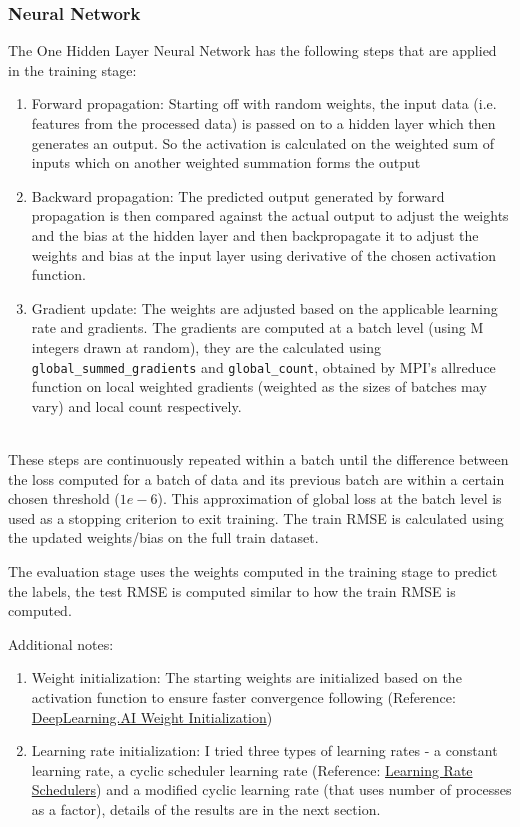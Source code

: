 \documentclass{article}
\begin{document}
\subsubsection{Neural Network}
The One Hidden Layer Neural Network has the following steps that are applied in the training stage:
\begin{enumerate}
    \item Forward propagation: Starting off with random weights, the input data (i.e. features from the processed data) is passed on to a hidden layer which then generates an output. So the activation is calculated on the weighted sum of inputs which on another weighted summation forms the output
    \item Backward propagation: The predicted output generated by forward propagation is then compared against the actual output to adjust the weights and the bias at the hidden layer and then backpropagate it to adjust the weights and bias at the input layer using derivative of the chosen activation function. 
    \item Gradient update: The weights are adjusted based on the applicable learning rate and gradients. The gradients are computed at a batch level (using M integers drawn at random), they are the calculated using \\ \verb|global_summed_gradients| and \verb|global_count|, obtained by MPI's allreduce function on local weighted gradients (weighted as the sizes of batches may vary) and local count respectively.
\end{enumerate} \\

These steps are continuously repeated within a batch until the difference between the loss computed for a batch of data and its previous batch are within a certain chosen threshold ($1e-6$). This approximation of global loss at the batch level is used as a stopping criterion to exit training. The train RMSE is calculated using the updated weights/bias on the full train dataset.

The evaluation stage uses the weights computed in the training stage to predict the labels, the test RMSE is computed similar to how the train RMSE is computed. 

Additional notes:

\begin{enumerate}
    \item Weight initialization: The starting weights are initialized based on the activation function to ensure faster
    convergence following (Reference: \\ \href{https://www.deeplearning.ai/ai-notes/initialization/index.html}{DeepLearning.AI Weight Initialization})
    \item Learning rate initialization: I tried three types of learning rates - a constant learning rate, a cyclic scheduler learning rate (Reference: \href{https://machinelearningmastery.com/a-gentle-introduction-to-learning-rate-schedulers/}{Learning Rate Schedulers}) and a modified cyclic learning rate (that uses number of processes as a factor), details of the results are in the next section.
\end{enumerate}
\end{document}
